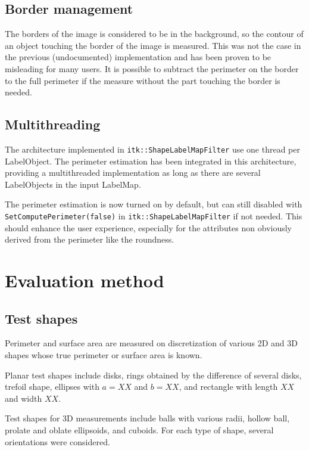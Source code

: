 \documentclass{InsightArticle}
\begin{document}
\subsection{Border management}

The borders of the image is considered to be in the background, so the contour of an object touching the border of the image is measured.
This was not the case in the previous (undocumented) implementation and has been proven to be misleading for many users.
It is possible to subtract the perimeter on the border to the full perimeter if the measure without the part touching the border is needed.

\subsection{Multithreading}

The architecture implemented in \verb$itk::ShapeLabelMapFilter$ use one thread per LabelObject. The perimeter estimation has been integrated in this
architecture, providing a multithreaded implementation as long as there are several LabelObjects in the input LabelMap.


The perimeter estimation is now turned on by default, but can still disabled with \verb$SetComputePerimeter(false)$ in
\verb$itk::ShapeLabelMapFilter$ if not needed. This should enhance the user experience, especially for the attributes non obviously derived
from the perimeter like the roundness.


\section{Evaluation method}

\subsection{Test shapes}

Perimeter and surface area are measured on discretization of various 2D and 3D shapes 
whose true perimeter or surface area is known.

Planar test shapes include disks, rings obtained by the difference of several disks,
trefoil shape, ellipses with $a=XX$ and $b=XX$, and rectangle with length $XX$ and width $XX$.

Test shapes for 3D measurements include
balls with various radii, hollow ball, prolate and oblate ellipsoids, and cuboids. 
For each type of shape, several orientations were considered.
\end{document}
